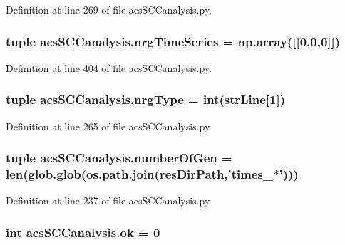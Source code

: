 Definition at line 269 of file acs\-S\-C\-Canalysis.\-py.

\hypertarget{a00097_ad4d4abc783f2f7f8d1084b1144b4fe2f}{
\subsubsection[{nrg\-Time\-Series}]{\setlength{\rightskip}{0pt plus 5cm}tuple acs\-S\-C\-Canalysis.\-nrg\-Time\-Series = np.\-array(\mbox{[}\mbox{[}0,0,0\mbox{]}\mbox{]})}}\label{a00097_ad4d4abc783f2f7f8d1084b1144b4fe2f}


Definition at line 404 of file acs\-S\-C\-Canalysis.\-py.

\hypertarget{a00097_a0d0c83fd90489be59b1f5a31dadf4469}{
\subsubsection[{nrg\-Type}]{\setlength{\rightskip}{0pt plus 5cm}tuple acs\-S\-C\-Canalysis.\-nrg\-Type = int({\bf str\-Line}\mbox{[}1\mbox{]})}}\label{a00097_a0d0c83fd90489be59b1f5a31dadf4469}


Definition at line 265 of file acs\-S\-C\-Canalysis.\-py.

\hypertarget{a00097_a9a81829f850e2e125e3c94214da7a1f0}{
\subsubsection[{number\-Of\-Gen}]{\setlength{\rightskip}{0pt plus 5cm}tuple acs\-S\-C\-Canalysis.\-number\-Of\-Gen = len(glob.\-glob(os.\-path.\-join({\bf res\-Dir\-Path},'times\-\_\-$\ast$')))}}\label{a00097_a9a81829f850e2e125e3c94214da7a1f0}


Definition at line 237 of file acs\-S\-C\-Canalysis.\-py.

\hypertarget{a00097_a9ce833d782f17d858941cfa76914599a}{
\subsubsection[{ok}]{\setlength{\rightskip}{0pt plus 5cm}int acs\-S\-C\-Canalysis.\-ok = 0}}\label{a00097_a9ce833d782f17d858941cfa76914599a}


